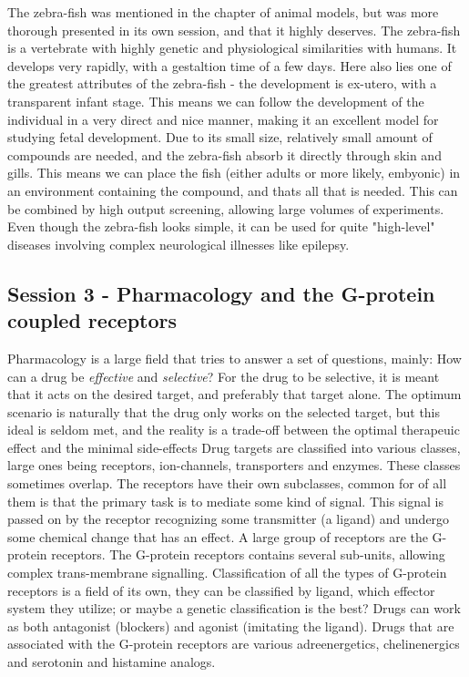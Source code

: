 \documentclass[12p]{article}
\begin{document}
The zebra-fish was mentioned in the chapter of animal models, but was more thorough presented in its own session, and that it highly deserves.
The zebra-fish is a vertebrate with highly genetic and physiological similarities with humans.
It develops very rapidly, with a gestaltion time of a few days.
Here also lies one of the greatest attributes of the zebra-fish - the development is ex-utero, with a transparent infant stage.
This means we can follow the development of the individual in a very direct and nice manner, making it an excellent model for studying fetal development.
Due to its small size, relatively small amount of compounds are needed, and the zebra-fish absorb it directly through skin and gills.
This means we can place the fish (either adults or more likely, embyonic) in an environment containing the compound, and thats all that is needed.
This can be combined by high output screening, allowing large volumes of experiments.
Even though the zebra-fish looks simple, it can be used for quite "high-level" diseases involving complex neurological illnesses like epilepsy.

\subsection*{Session 3 - Pharmacology and the G-protein coupled receptors}

Pharmacology is a large field that tries to answer a set of questions, mainly: How can a drug be \emph{effective} and \emph{selective}?
For the drug to be selective, it is meant that it acts on the desired target, and preferably that target alone.
The optimum scenario is naturally that the drug only works on the selected target, but this ideal is seldom met, and the reality is a trade-off between the optimal therapeuic effect and the minimal side-effects
Drug targets are classified into various classes, large ones being receptors, ion-channels, transporters and enzymes. 
These classes sometimes overlap.
The receptors have their own subclasses, common for of all them is that the primary task is to mediate some kind of signal.
This signal is passed on by the receptor recognizing some transmitter (a ligand) and undergo some chemical change that has an effect.
A large group of receptors are the G-protein receptors.
The G-protein receptors contains several sub-units, allowing complex trans-membrane signalling.
Classification of all the types of G-protein receptors is a field of its own, they can be classified by ligand, which effector system they utilize; or maybe a genetic classification is the best?
Drugs can work as both antagonist (blockers) and agonist (imitating the ligand).
Drugs that are associated with the G-protein receptors are various adreenergetics, chelinenergics and serotonin and histamine analogs.
\end{document}
